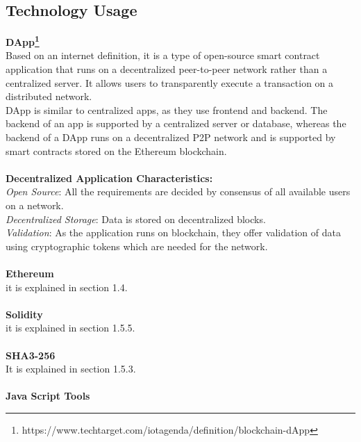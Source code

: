 \subsection{Technology Usage}
\textbf{DApp\footnote{https://www.techtarget.com/iotagenda/definition/blockchain-dApp}} \\
Based on an internet definition, it is a type of open-source smart contract application that runs on a decentralized peer-to-peer network rather than a centralized server. It allows users to transparently execute a transaction on a distributed network. \\
DApp is similar to centralized apps, as they use frontend and backend. The backend of an app is supported by a centralized server or database, whereas the backend of a DApp runs on a decentralized P2P network and is supported by smart contracts stored on the Ethereum blockchain.\\
\\
\textbf{Decentralized Application Characteristics:}\\
	\textit{Open Source}: All the requirements are decided by consensus of all available users on a network.\\
	\textit{Decentralized Storage}: Data is stored on decentralized blocks.\\
	\textit{Validation}: As the application runs on blockchain, they offer validation of data using cryptographic tokens which are needed for the network. \\
 \\
\textbf{Ethereum} \\
it is explained in section 1.4.\\
\\
\textbf{Solidity} \\
it is explained in section 1.5.5.\\
\\
\textbf{SHA3-256} \\It is explained in section 1.5.3.\\
\\
\textbf{Java Script Tools} 
